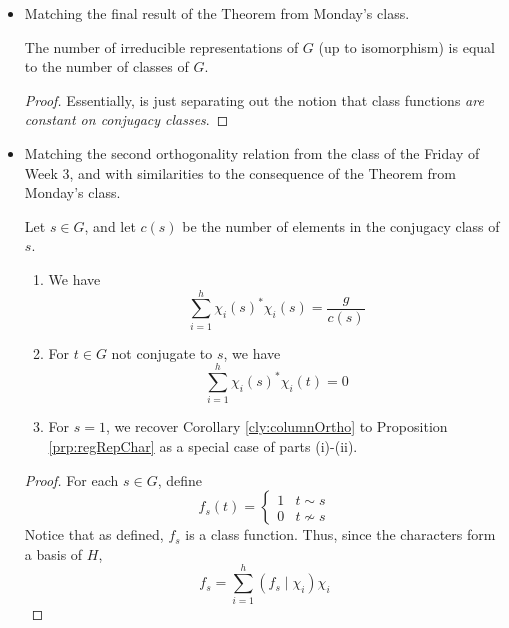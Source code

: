 \documentclass[../notes.tex]{subfiles}
\begin{document}
\begin{itemize}
    \item Matching the final result of the Theorem from Monday's class.
    \begin{theorem}
        The number of irreducible representations of $G$ (up to isomorphism) is equal to the number of classes of $G$.
        \begin{proof}
            Essentially, \textcite{bib:Serre} is just separating out the notion that class functions \emph{are constant on conjugacy classes}.
        \end{proof}
    \end{theorem}
    \item Matching the second orthogonality relation from the class of the Friday of Week 3, and with similarities to the consequence of the Theorem from Monday's class.
    \begin{proposition}
        Let $s\in G$, and let $c(s)$ be the number of elements in the conjugacy class of $s$.
        \begin{enumerate}[label={\textup{(\roman*)}}]
            \item We have
            \begin{equation*}
                \sum_{i=1}^h\chi_i(s)^*\chi_i(s) = \frac{g}{c(s)}
            \end{equation*}
            \item For $t\in G$ not conjugate to $s$, we have
            \begin{equation*}
                \sum_{i=1}^h\chi_i(s)^*\chi_i(t) = 0
            \end{equation*}
            \item For $s=1$, we recover Corollary \ref{cly:columnOrtho} to Proposition \ref{prp:regRepChar} as a special case of parts (i)-(ii).
        \end{enumerate}
        \begin{proof}
            For each $s\in G$, define
            \begin{equation*}
                f_s(t) =
                \begin{cases}
                    1 & t\sim s\\
                    0 & t\nsim s
                \end{cases}
            \end{equation*}
            Notice that as defined, $f_s$ is a class function. Thus, since the characters form a basis of $H$,
            \begin{equation*}
                f_s = \sum_{i=1}^h(f_s\mid\chi_i)\chi_i

\end{equation*}
\end{proof}
\end{proposition}
\end{itemize}
\end{document}
